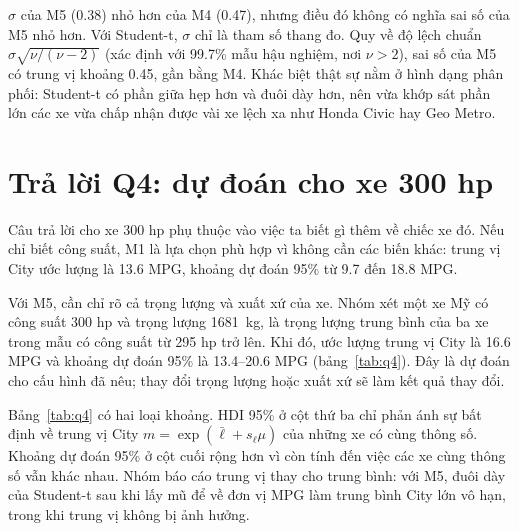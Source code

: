 \documentclass[12pt,a4paper]{report}
\begin{document}
$\sigma$ của M5 (\num{0.38}) nhỏ hơn của M4 (\num{0.47}), nhưng điều đó không có
nghĩa sai số của M5 nhỏ hơn. Với Student-t, $\sigma$ chỉ là tham số thang đo.
Quy về độ lệch chuẩn $\sigma\sqrt{\nu/(\nu-2)}$ (xác định với \num{99.7}\% mẫu
hậu nghiệm, nơi $\nu > 2$), sai số của M5 có trung vị khoảng \num{0.45}, gần
bằng M4. Khác biệt thật sự nằm ở hình dạng phân phối: Student-t có phần giữa
hẹp hơn và đuôi dày hơn, nên vừa khớp sát phần lớn các xe vừa chấp nhận được
vài xe lệch xa như Honda Civic hay Geo Metro.


\section{Trả lời Q4: dự đoán cho xe 300 hp}
\label{sec:q4}

Câu trả lời cho xe 300 hp phụ thuộc vào việc ta biết gì thêm về chiếc xe đó.
Nếu chỉ biết công suất, M1 là lựa chọn phù hợp vì không cần các biến khác:
trung vị City ước lượng là \num{13.6} MPG, khoảng dự đoán 95\% từ \num{9.7}
đến \num{18.8} MPG.

Với M5, cần chỉ rõ cả trọng lượng và xuất xứ của xe. Nhóm xét một xe Mỹ có
công suất 300 hp và trọng lượng \SI{1681}{kg}, là trọng lượng trung bình của
ba xe trong mẫu có công suất từ 295 hp trở lên. Khi đó, ước lượng trung vị
City là \num{16.6} MPG và khoảng dự đoán 95\% là \num{13.4}--\num{20.6} MPG
(bảng~\ref{tab:q4}). Đây là dự đoán cho cấu hình đã nêu; thay đổi trọng lượng
hoặc xuất xứ sẽ làm kết quả thay đổi.

Bảng~\ref{tab:q4} có hai loại khoảng. HDI 95\% ở cột thứ ba chỉ phản ánh sự
bất định về trung vị City $m = \exp(\bar{\ell} + s_\ell\mu)$ của những xe có
cùng thông số. Khoảng dự đoán 95\% ở cột cuối rộng hơn vì còn tính đến việc các
xe cùng thông số vẫn khác nhau. Nhóm báo cáo trung vị thay cho trung bình: với
M5, đuôi dày của Student-t sau khi lấy mũ để về đơn vị MPG làm trung bình City
lớn vô hạn, trong khi trung vị không bị ảnh hưởng.
\end{document}
